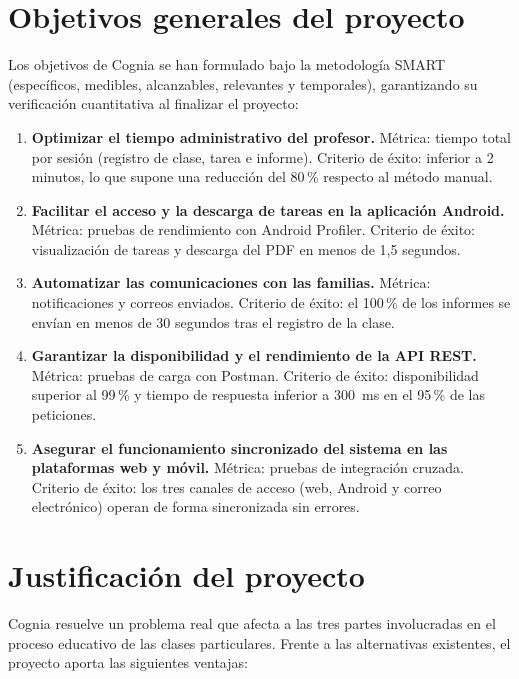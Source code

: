 \documentclass[12pt,a4paper]{report}
\begin{document}
\section{Objetivos generales del proyecto}

Los objetivos de Cognia se han formulado bajo la metodología SMART
(específicos, medibles, alcanzables, relevantes y temporales),
garantizando su verificación cuantitativa al finalizar el proyecto:

\begin{enumerate}
    \item \textbf{Optimizar el tiempo administrativo del profesor.}
    Métrica: tiempo total por sesión (registro de clase, tarea e
    informe). Criterio de éxito: inferior a 2 minutos, lo que supone una
    reducción del 80\,\% respecto al método manual.

    \item \textbf{Facilitar el acceso y la descarga de tareas en la
    aplicación Android.} Métrica: pruebas de rendimiento con Android
    Profiler. Criterio de éxito: visualización de tareas y descarga del
    PDF en menos de 1,5 segundos.

    \item \textbf{Automatizar las comunicaciones con las familias.}
    Métrica: notificaciones y correos enviados. Criterio de éxito: el
    100\,\% de los informes se envían en menos de 30 segundos tras el
    registro de la clase.

    \item \textbf{Garantizar la disponibilidad y el rendimiento de la
    API REST.} Métrica: pruebas de carga con Postman. Criterio de éxito:
    disponibilidad superior al 99\,\% y tiempo de respuesta inferior a
    300~ms en el 95\,\% de las peticiones.

    \item \textbf{Asegurar el funcionamiento sincronizado del sistema
    en las plataformas web y móvil.} Métrica: pruebas de integración
    cruzada. Criterio de éxito: los tres canales de acceso (web, Android
    y correo electrónico) operan de forma sincronizada sin errores.
\end{enumerate}

\section{Justificación del proyecto}

Cognia resuelve un problema real que afecta a las tres partes
involucradas en el proceso educativo de las clases particulares. Frente a
las alternativas existentes, el proyecto aporta las siguientes ventajas:
\end{document}
